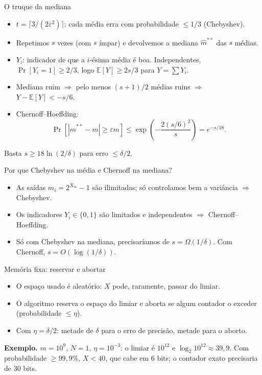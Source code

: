 \documentclass[aspectratio=169,10pt]{beamer}
\newcommand{\teto}[1]{\lceil #1\rceil}
\newcommand{\Abs}[1]{\left|#1\right|}
\newcommand{\E}[1]{\mathbb{E}\!\left[#1\right]}
\newcommand{\ProbE}[1]{\Pr\!\left[#1\right]}
\newcommand{\paren}[1]{\left(#1\right)}
\begin{document}
\begin{frame}{O truque da mediana}
  \begin{itemize}
  \item $t=\teto{3/(2\varepsilon^2)}$: cada média erra com probabilidade
    $\leq1/3$ (Chebyshev).
  \item Repetimos $s$ vezes (com $s$ ímpar) e devolvemos a
    \alert{mediana} $\widehat m^{**}$ das $s$ médias.
  \item $Y_i$: indicador de que a $i$-ésima média é boa. Independentes,
    $\Pr[Y_i=1]\geq2/3$, logo $\E Y\geq2s/3$ para $Y=\sum Y_i$.
  \item Mediana ruim $\Rightarrow$ pelo menos $(s+1)/2$ médias ruins
    $\Rightarrow$ $Y-\E Y<-s/6$.
  \item Chernoff--Hoeffding:
    \[
      \ProbE{\Abs{\widehat m^{**}-m}\geq\varepsilon m}
      \leq\exp\paren{-\frac{2(s/6)^2}{s}}=e^{-s/18}.
    \]
  \end{itemize}
  Basta $s\geq18\ln(2/\delta)$ para erro $\leq\delta/2$.
\end{frame}

\begin{frame}{Por que Chebyshev na média e Chernoff na mediana?}
  \begin{itemize}
  \item As saídas $\widehat m_i=2^{X_m}-1$ são \alert{ilimitadas}; só
    controlamos bem a variância $\Rightarrow$ Chebyshev.
  \item Os indicadores $Y_i\in\{0,1\}$ são limitados e independentes
    $\Rightarrow$ Chernoff--Hoeffding.
  \item Só com Chebyshev na mediana, precisaríamos de $s=\Omega(1/\delta)$.
    Com Chernoff, $s=O(\log(1/\delta))$.
  \end{itemize}
\end{frame}

 
\begin{frame}{Memória fixa: reservar e abortar}
  \begin{itemize}
  \item O espaço usado é \alert{aleatório}: $X$ pode, raramente, passar
    do limiar.
  \item O algoritmo \alert{reserva} o espaço do limiar e \alert{aborta}
    se algum contador o exceder (probabilidade $\leq\eta$).
  \item Com $\eta=\delta/2$: metade de $\delta$ para o erro de
    precisão, metade para o aborto.
  \end{itemize}
  \medskip
  \textbf{Exemplo.} $m=10^9$, $N=1$, $\eta=10^{-3}$: o limiar é
  $10^{12}$ e $\log_2 10^{12}\approx39{,}9$. Com probabilidade
  $\geq99{,}9\%$, $X<40$, que cabe em \alert{6 bits}; o contador exato
  precisaria de $30$ bits.
\end{frame}
\end{document}
